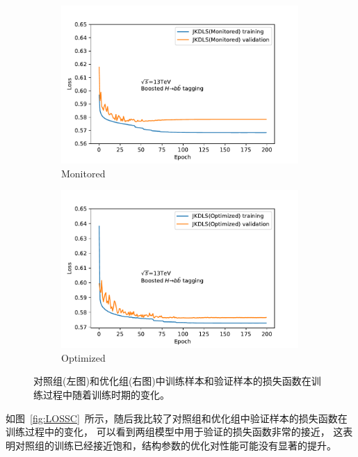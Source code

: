 \begin{figure}[htbp]
  \begin{subfigure}{.5\textwidth}
  \centering
   \includegraphics[width=0.99\textwidth]{figuresXbb/LossMON.pdf}
   \caption{Monitored}
  \end{subfigure}
  \begin{subfigure}{.5\textwidth}
  \centering
   \includegraphics[width=0.99\textwidth]{figuresXbb/LossOPT.pdf}
   \caption{Optimized}
  \end{subfigure}
  \caption{
 对照组(左图)和优化组(右图)中训练样本和验证样本的损失函数在训练过程中随着训练时期的变化。
  }
  \label{fig:LOSS}
\end{figure} 

如图~\ref{fig:LOSSC}~所示，随后我比较了对照组和优化组中验证样本的损失函数在训练过程中的变化，
可以看到两组模型中用于验证的损失函数非常的接近，
这表明对照组的训练已经接近饱和，结构参数的优化对性能可能没有显著的提升。

